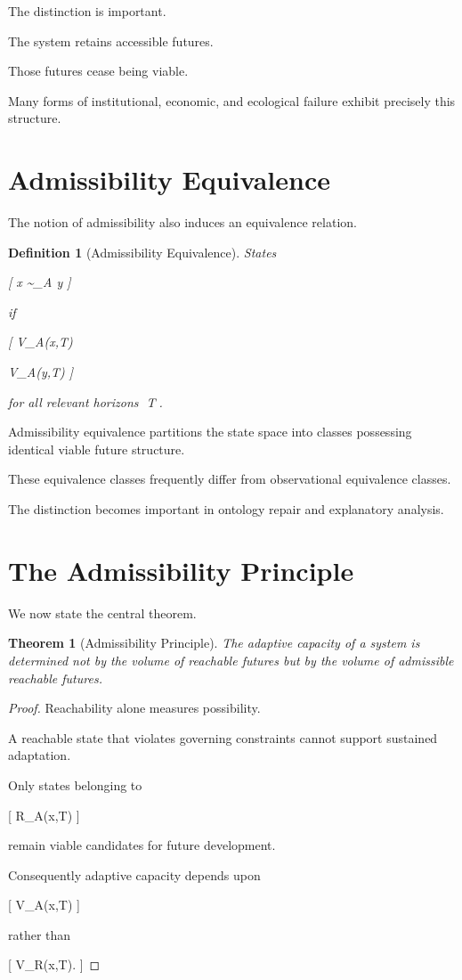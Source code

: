 \documentclass[11pt,oneside,openany]{book}
\newtheorem{definition}{Definition}[chapter] \newtheorem{theorem}{Theorem}[chapter] \newtheorem{proposition}{Proposition}[chapter] \newtheorem{lemma}{Lemma}[chapter] \newtheorem{corollary}{Corollary}[chapter] \newtheorem{remark}{Remark}[chapter]
\begin{document}
The distinction is important.

The system retains accessible futures.

Those futures cease being viable.

Many forms of institutional, economic, and ecological failure exhibit precisely this structure.

\section{Admissibility Equivalence}

The notion of admissibility also induces an equivalence relation.

\begin{definition}[Admissibility Equivalence]

States

[
x
\sim_A
y
]

if

[
V_A(x,T)

V_A(y,T)
]

for all relevant horizons T.

\end{definition}

Admissibility equivalence partitions the state space into classes possessing identical viable future structure.

These equivalence classes frequently differ from observational equivalence classes.

The distinction becomes important in ontology repair and explanatory analysis.

\section{The Admissibility Principle}

We now state the central theorem.

\begin{theorem}[Admissibility Principle]

The adaptive capacity of a system is determined not by the volume of reachable futures but by the volume of admissible reachable futures.

\end{theorem}

\begin{proof}

Reachability alone measures possibility.

A reachable state that violates governing constraints cannot support sustained adaptation.

Only states belonging to

[
R_A(x,T)
]

remain viable candidates for future development.

Consequently adaptive capacity depends upon

[
V_A(x,T)
]

rather than

[
V_R(x,T).
]

\end{proof}
\end{document}
